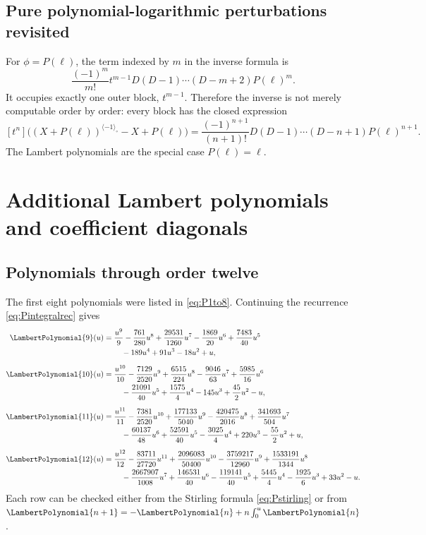 \documentclass[11pt,oneside,openany]{book}
\newcommand{\rev}{^{\langle-1\rangle_{\circ}}}
\begin{document}
\section{Pure polynomial-logarithmic perturbations revisited}
For \(\phi=P(\ell)\), the term indexed by \(m\) in the inverse formula is
\begin{equation}\label{eq:appendixPterm}
 \frac{(-1)^m}{m!}
 t^{m-1}D(D-1)\cdots(D-m+2)P(\ell)^m.
\end{equation}
It occupies exactly one outer block, \(t^{m-1}\).  Therefore the inverse is
not merely computable order by order: every block has the closed expression
\[
 [t^n]\bigl((X+P(\ell))\rev-X+P(\ell)\bigr)
 =\frac{(-1)^{n+1}}{(n+1)!}
 D(D-1)\cdots(D-n+1)P(\ell)^{n+1}.
\]
The Lambert polynomials are the special case \(P(\ell)=\ell\).


\chapter{Additional Lambert polynomials and coefficient diagonals}
\label{app:polynomials}

\section{Polynomials through order twelve}
The first eight polynomials were listed in \cref{eq:P1to8}.  Continuing the
recurrence \cref{eq:Pintegralrec} gives
\begin{align*}
\LambertPolynomial{9}(u)={}&\frac{u^9}{9}-\frac{761}{280}u^8
 +\frac{29531}{1260}u^7-\frac{1869}{20}u^6
 +\frac{7483}{40}u^5\\
&\quad -189u^4+91u^3-18u^2+u,\\[2mm]
\LambertPolynomial{10}(u)={}&\frac{u^{10}}{10}-\frac{7129}{2520}u^9
 +\frac{6515}{224}u^8-\frac{9046}{63}u^7
 +\frac{5985}{16}u^6\\
&\quad -\frac{21091}{40}u^5+\frac{1575}{4}u^4
 -145u^3+\frac{45}{2}u^2-u,\\[2mm]
\LambertPolynomial{11}(u)={}&\frac{u^{11}}{11}-\frac{7381}{2520}u^{10}
 +\frac{177133}{5040}u^9-\frac{420475}{2016}u^8
 +\frac{341693}{504}u^7\\
&\quad -\frac{60137}{48}u^6+\frac{52591}{40}u^5
 -\frac{3025}{4}u^4+220u^3-\frac{55}{2}u^2+u,\\[2mm]
\LambertPolynomial{12}(u)={}&\frac{u^{12}}{12}-\frac{83711}{27720}u^{11}
 +\frac{2096083}{50400}u^{10}-\frac{3759217}{12960}u^9
 +\frac{1533191}{1344}u^8\\
&\quad -\frac{2667907}{1008}u^7+\frac{146531}{40}u^6
 -\frac{119141}{40}u^5+\frac{5445}{4}u^4
 -\frac{1925}{6}u^3+33u^2-u.
\end{align*}
Each row can be checked either from the Stirling formula
\cref{eq:Pstirling} or from
\(\LambertPolynomial{n+1}=-\LambertPolynomial{n}+n\int_0^u\LambertPolynomial{n}\).
\end{document}
